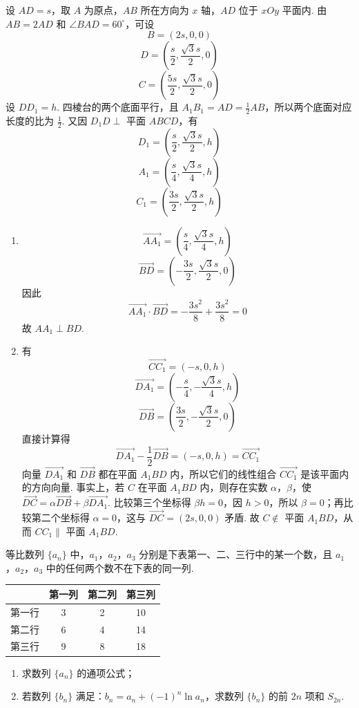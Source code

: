 \begin{solution}
设 \(AD=s\)，取 \(A\) 为原点，\(AB\) 所在方向为 \(x\) 轴，\(AD\) 位于 \(xOy\) 平面内. 由 \(AB=2AD\) 和 \(\angle BAD=60^{\circ}\)，可设
\[
B=(2s,0,0)
\]
\[
D=\left(\frac{s}{2},\frac{\sqrt{3}s}{2},0\right)
\]
\[
C=\left(\frac{5s}{2},\frac{\sqrt{3}s}{2},0\right)
\]
设 \(DD_1=h\). 四棱台的两个底面平行，且 \(A_1B_1=AD=\frac12AB\)，所以两个底面对应长度的比为 \(\frac12\). 又因 \(D_1D\perp\) 平面 \(ABCD\)，有
\[
D_1=\left(\frac{s}{2},\frac{\sqrt{3}s}{2},h\right)
\]
\[
A_1=\left(\frac{s}{4},\frac{\sqrt{3}s}{4},h\right)
\]
\[
C_1=\left(\frac{3s}{2},\frac{\sqrt{3}s}{2},h\right)
\]

\begin{enumerate}
\item
\[
\overrightarrow{AA_1}=\left(\frac{s}{4},\frac{\sqrt{3}s}{4},h\right)
\]
\[
\overrightarrow{BD}=\left(-\frac{3s}{2},\frac{\sqrt{3}s}{2},0\right)
\]
因此
\[
\overrightarrow{AA_1}\cdot\overrightarrow{BD}=-\frac{3s^{2}}{8}+\frac{3s^{2}}{8}=0
\]
故 \(AA_1\perp BD\).

\item 有
\[
\overrightarrow{CC_1}=(-s,0,h)
\]
\[
\overrightarrow{DA_1}=\left(-\frac{s}{4},-\frac{\sqrt{3}s}{4},h\right)
\]
\[
\overrightarrow{DB}=\left(\frac{3s}{2},-\frac{\sqrt{3}s}{2},0\right)
\]
直接计算得
\[
\overrightarrow{DA_1}-\frac12\overrightarrow{DB}=(-s,0,h)=\overrightarrow{CC_1}
\]
向量 \(\overrightarrow{DA_1}\) 和 \(\overrightarrow{DB}\) 都在平面 \(A_1BD\) 内，所以它们的线性组合 \(\overrightarrow{CC_1}\) 是该平面内的方向向量.
事实上，若 \(C\) 在平面 \(A_1BD\) 内，则存在实数 \(\alpha\)，\(\beta\)，使 \(\overrightarrow{DC}=\alpha\overrightarrow{DB}+\beta\overrightarrow{DA_1}\). 比较第三个坐标得 \(\beta h=0\)，因 \(h>0\)，所以 \(\beta=0\)；再比较第二个坐标得 \(\alpha=0\)，这与 \(\overrightarrow{DC}=(2s,0,0)\) 矛盾.
故 \(C\notin\) 平面 \(A_1BD\)，从而 \(CC_1\parallel\) 平面 \(A_1BD\).
\end{enumerate}
\end{solution}

\begin{problem}
等比数列 \(\{a_{n}\}\) 中，\(a_{1}\)，\(a_{2}\)，\(a_{3}\) 分别是下表第一、二、三行中的某一个数，且 \(a_{1}\)，\(a_{2}\)，\(a_{3}\) 中的任何两个数不在下表的同一列.

\begin{center}
\begin{tabular}{c|ccc}
 & 第一列 & 第二列 & 第三列 \\
\hline
第一行 & 3 & 2 & 10 \\
第二行 & 6 & 4 & 14 \\
第三行 & 9 & 8 & 18
\end{tabular}
\end{center}

\begin{enumerate}
\item 求数列 \(\{a_{n}\}\) 的通项公式；
\item 若数列 \(\{b_{n}\}\) 满足：\(b_{n}=a_{n}+(-1)^{n}\ln a_{n}\)，求数列 \(\{b_{n}\}\) 的前 \(2n\) 项和 \(S_{2n}\).
\end{enumerate}
\end{problem}

